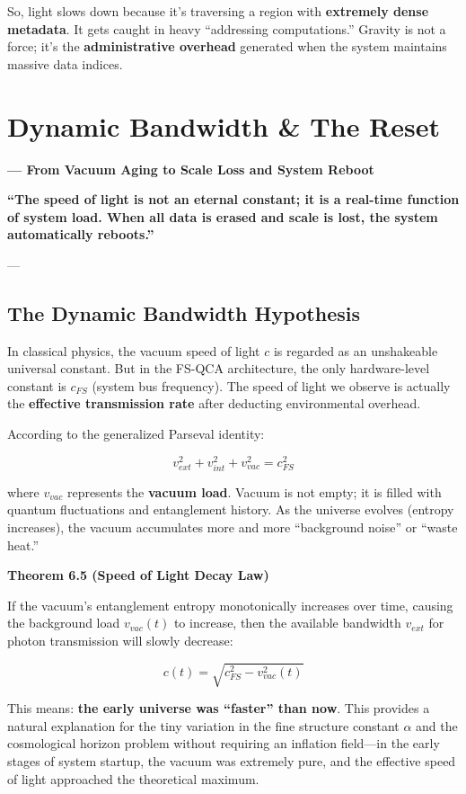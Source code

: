 \documentclass[11pt,a4paper,twoside]{book}
\begin{document}
So, light slows down because it's traversing a region with \textbf{extremely dense metadata}. It gets caught in heavy ``addressing computations.'' Gravity is not a force; it's the \textbf{administrative overhead} generated when the system maintains massive data indices.

 \section{Dynamic Bandwidth \& The Reset}

\textbf{--- From Vacuum Aging to Scale Loss and System Reboot}

\textbf{``The speed of light is not an eternal constant; it is a real-time function of system load. When all data is erased and scale is lost, the system automatically reboots.''}

---

\subsection{The Dynamic Bandwidth Hypothesis}

In classical physics, the vacuum speed of light \textbf{$c$} is regarded as an unshakeable universal constant. But in the FS-QCA architecture, the only hardware-level constant is \textbf{$c_{FS}$} (system bus frequency). The speed of light we observe is actually the \textbf{effective transmission rate} after deducting environmental overhead.

According to the generalized Parseval identity:

$$v_{ext}^2 + v_{int}^2 + v_{vac}^2 = c_{FS}^2$$

where \textbf{$v_{vac}$} represents the \textbf{vacuum load}. Vacuum is not empty; it is filled with quantum fluctuations and entanglement history. As the universe evolves (entropy increases), the vacuum accumulates more and more ``background noise'' or ``waste heat.''

\textbf{Theorem 6.5 (Speed of Light Decay Law)}

If the vacuum's entanglement entropy monotonically increases over time, causing the background load \textbf{$v_{vac}(t)$} to increase, then the available bandwidth \textbf{$v_{ext}$} for photon transmission will slowly decrease:

$$c(t) = \sqrt{c_{FS}^2 - v_{vac}^2(t)}$$

This means: \textbf{the early universe was ``faster'' than now}. This provides a natural explanation for the tiny variation in the fine structure constant \textbf{$\alpha$} and the cosmological horizon problem without requiring an inflation field---in the early stages of system startup, the vacuum was extremely pure, and the effective speed of light approached the theoretical maximum.
\end{document}
